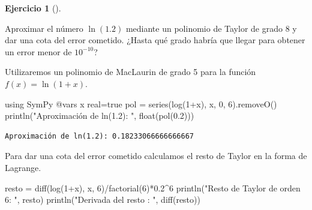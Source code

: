 \documentclass[
  a4paper,
]{scrreport}
\newenvironment{Shaded}{\begin{snugshade}}{\end{snugshade}}
\newcommand{\BuiltInTok}[1]{\textcolor[rgb]{0.00,0.23,0.31}{#1}}
\newcommand{\ConstantTok}[1]{\textcolor[rgb]{0.56,0.35,0.01}{#1}}
\newcommand{\FloatTok}[1]{\textcolor[rgb]{0.68,0.00,0.00}{#1}}
\newcommand{\FunctionTok}[1]{\textcolor[rgb]{0.28,0.35,0.67}{#1}}
\newcommand{\ImportTok}[1]{\textcolor[rgb]{0.00,0.46,0.62}{#1}}
\newcommand{\NormalTok}[1]{\textcolor[rgb]{0.00,0.23,0.31}{#1}}
\newcommand{\OperatorTok}[1]{\textcolor[rgb]{0.37,0.37,0.37}{#1}}
\newcommand{\PreprocessorTok}[1]{\textcolor[rgb]{0.68,0.00,0.00}{#1}}
\newcommand{\StringTok}[1]{\textcolor[rgb]{0.13,0.47,0.30}{#1}}
\theoremstyle{definition}
\newtheorem{exercise}{Ejercicio}[chapter]
\theoremstyle{remark}
\begin{document}
\leavevmode{}%
\begin{exercise}[]\label{exr-taylor-3}

Aproximar el número \(\ln(1.2)\) mediante un polinomio de Taylor de
grado 8 y dar una cota del error cometido. ¿Hasta qué grado habría que
llegar para obtener un error menor de \(10^{-10}\)?

\begin{tcolorbox}[enhanced jigsaw, toprule=.15mm, arc=.35mm, bottomrule=.15mm, titlerule=0mm, bottomtitle=1mm, opacitybacktitle=0.6, colbacktitle=quarto-callout-tip-color!10!white, colframe=quarto-callout-tip-color-frame, opacityback=0, title=\textcolor{quarto-callout-tip-color}{\faLightbulb}\hspace{0.5em}{Solución}, breakable, colback=white, toptitle=1mm, leftrule=.75mm, coltitle=black, rightrule=.15mm, left=2mm]

Utilizaremos un polinomio de MacLaurin de grado 5 para la función
\(f(x)=\ln(1+x)\).

\begin{Shaded}
\begin{Highlighting}[]
\ImportTok{using} \BuiltInTok{SymPy}
\PreprocessorTok{@vars}\NormalTok{ x real}\OperatorTok{=}\ConstantTok{true}
\NormalTok{pol }\OperatorTok{=} \FunctionTok{series}\NormalTok{(}\FunctionTok{log}\NormalTok{(}\FloatTok{1}\OperatorTok{+}\NormalTok{x), x, }\FloatTok{0}\NormalTok{, }\FloatTok{6}\NormalTok{).}\FunctionTok{removeO}\NormalTok{()}
\FunctionTok{println}\NormalTok{(}\StringTok{"Aproximación de ln(1.2): "}\NormalTok{, }\FunctionTok{float}\NormalTok{(}\FunctionTok{pol}\NormalTok{(}\FloatTok{0.2}\NormalTok{)))}
\end{Highlighting}
\end{Shaded}

\begin{verbatim}
Aproximación de ln(1.2): 0.18233066666666667
\end{verbatim}

Para dar una cota del error cometido calculamos el resto de Taylor en la
forma de Lagrange.

\begin{Shaded}
\begin{Highlighting}[]
\NormalTok{resto }\OperatorTok{=} \FunctionTok{diff}\NormalTok{(}\FunctionTok{log}\NormalTok{(}\FloatTok{1}\OperatorTok{+}\NormalTok{x), x, }\FloatTok{6}\NormalTok{)}\OperatorTok{/}\FunctionTok{factorial}\NormalTok{(}\FloatTok{6}\NormalTok{)}\OperatorTok{*}\FloatTok{0.2}\OperatorTok{\^{}}\FloatTok{6}
\FunctionTok{println}\NormalTok{(}\StringTok{"Resto de Taylor de orden 6: "}\NormalTok{, resto)}
\FunctionTok{println}\NormalTok{(}\StringTok{"Derivada del resto : "}\NormalTok{, }\FunctionTok{diff}\NormalTok{(resto))}
\end{Highlighting}
\end{Shaded}


\end{tcolorbox}
\end{exercise}
\end{document}
